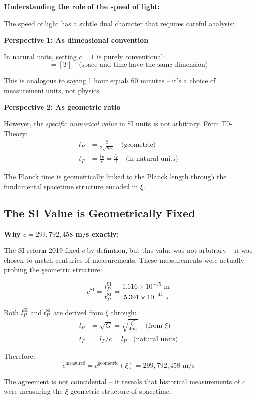 \documentclass[12pt,a4paper]{article}
\begin{document}
	\begin{derivation}
		\textbf{Understanding the role of the speed of light:}
		
		The speed of light has a subtle dual character that requires careful analysis:
		
		\textbf{Perspective 1: As dimensional convention}
		
		In natural units, setting $c = 1$ is purely conventional:
		\begin{equation}
			[L] = [T] \quad \text{(space and time have the same dimension)}
		\end{equation}
		
		This is analogous to saying 1 hour equals 60 minutes -- it's a choice of measurement units, not physics.
		
		\textbf{Perspective 2: As geometric ratio}
		
		However, the \emph{specific numerical value} in SI units is not arbitrary. From T0-Theory:
		\begin{align}
			l_P &= \frac{\xi}{2\sqrt{m_e}} \quad \text{(geometric)} \\
			t_P &= \frac{l_P}{c} = \frac{l_P}{1} \quad \text{(in natural units)}
		\end{align}
		
		The Planck time is geometrically linked to the Planck length through the fundamental spacetime structure encoded in $\xi$.
	\end{derivation}
	
	\subsection{The SI Value is Geometrically Fixed}
	
	\begin{keyresult}
		\textbf{Why $c = 299,792,458$ m/s exactly:}
		
		The SI reform 2019 fixed $c$ by definition, but this value was not arbitrary -- it was chosen to match centuries of measurements. These measurements were actually probing the geometric structure:
		
		\begin{equation}
			c^{\text{SI}} = \frac{l_P^{\text{SI}}}{t_P^{\text{SI}}} = \frac{1.616 \times 10^{-35} \text{ m}}{5.391 \times 10^{-44} \text{ s}}
		\end{equation}
		
		Both $l_P^{\text{SI}}$ and $t_P^{\text{SI}}$ are derived from $\xi$ through:
		\begin{align}
			l_P &= \sqrt{G} = \sqrt{\frac{\xi^2}{4m_e}} \quad \text{(from } \xi\text{)} \\
			t_P &= l_P/c = l_P \quad \text{(natural units)}
		\end{align}
		
		Therefore:
		\begin{equation}
			\boxed{c^{\text{measured}} = c^{\text{geometric}}(\xi) = 299,792,458 \text{ m/s}}
		\end{equation}
		
		The agreement is not coincidental -- it reveals that historical measurements of $c$ were measuring the $\xi$-geometric structure of spacetime.
	\end{keyresult}
	
\end{document}
